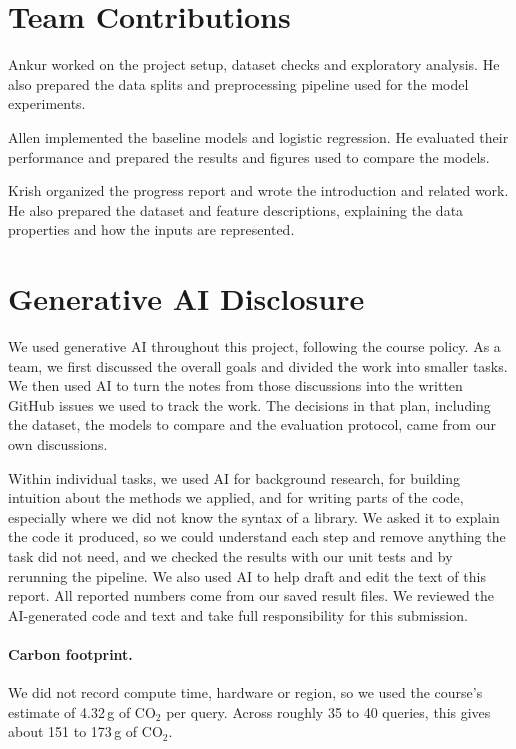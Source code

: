 \documentclass[11pt]{article}
\begin{document}
\section*{Team Contributions}

Ankur worked on the project setup, dataset checks and exploratory
analysis. He also prepared the data splits and preprocessing pipeline used
for the model experiments.

\medskip\noindent Allen implemented the baseline models and logistic regression. He
evaluated their performance and prepared the results and figures used to
compare the models.

\medskip\noindent Krish organized the progress report and wrote the introduction and
related work. He also prepared the dataset and feature descriptions,
explaining the data properties and how the inputs are represented.

\section*{Generative AI Disclosure}

We used generative AI throughout this project, following the course policy.
As a team, we first discussed the overall goals and divided the work into
smaller tasks. We then used AI to turn the notes from those discussions into
the written GitHub issues we used to track the work. The decisions in that
plan, including the dataset, the models to compare and the evaluation
protocol, came from our own discussions.

Within individual tasks, we used AI for background research, for building
intuition about the methods we applied, and for writing parts of the code,
especially where we did not know the syntax of a library. We asked it to
explain the code it produced, so we could understand each step and remove
anything the task did not need, and we checked the results with our unit
tests and by rerunning the pipeline. We also used AI to help draft and edit
the text of this report. All reported numbers come from our saved result
files. We reviewed the AI-generated code and text and take full
responsibility for this submission.

\paragraph{Carbon footprint.} We did not record compute time, hardware or
region, so we used the course's estimate of 4.32\,g of CO$_2$ per query.
Across roughly 35 to 40 queries, this gives about 151 to 173\,g of CO$_2$.

%





\end{document}
